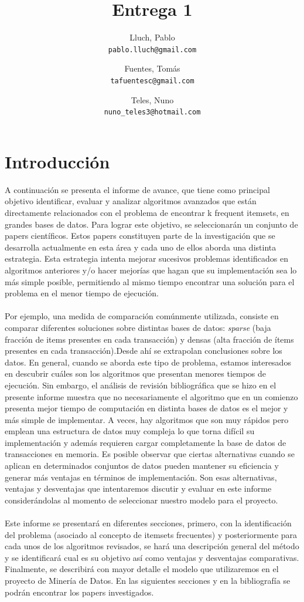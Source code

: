 \documentclass[12pt,spanish]{article}
\title{Entrega 1}
\author{
  Lluch, Pablo\\
  \texttt{pablo.lluch@gmail.com}
  \and
  Fuentes, Tomás\\
  \texttt{tafuentesc@gmail.com}
  \and
  Teles, Nuno\\
  \texttt{nuno\_teles3@hotmail.com}
}
\begin{document}
\maketitle
\newpage

\section{Introducci\'on}
A continuación se presenta el informe de avance, que tiene como principal objetivo identificar, evaluar y analizar algoritmos avanzados que están directamente relacionados con el problema de encontrar k frequent itemsets, en grandes bases de datos. Para lograr este objetivo, se seleccionar\'an un conjunto de papers científicos. Estos papers constituyen parte de la investigación que se desarrolla actualmente en esta área y cada uno de ellos aborda una distinta estrategia. Esta estrategia intenta mejorar sucesivos problemas identificados en algoritmos anteriores y/o hacer mejorías que hagan que su implementaci\'on sea lo más simple posible, permitiendo al mismo tiempo encontrar una solución para el problema en el menor tiempo de ejecución.
\\\\
Por ejemplo, una medida de comparación comúnmente utilizada, consiste en comparar diferentes soluciones sobre distintas bases de datos: \emph{sparse} (baja fracci\'on de items presentes en cada transacci\'on) y densas (alta fracción de ítems presentes en cada transacción).Desde ahí se extrapolan conclusiones sobre los datos. En general, cuando se aborda este tipo de problema, estamos interesados en descubrir cu\'ales son los algoritmos que presentan menores tiempos de ejecución. Sin embargo, el análisis de revisión bibliogr\'afica que se hizo en el presente informe muestra que no necesariamente el algoritmo que en un comienzo presenta mejor tiempo de computación en distinta bases de datos es el mejor y más simple de implementar. A veces, hay algoritmos que son muy rápidos pero emplean una estructura de datos muy compleja lo que torna difícil su implementación y además requieren cargar completamente la base de datos de transacciones en memoria. Es posible observar que ciertas alternativas cuando se aplican en determinados conjuntos de datos pueden mantener su eficiencia y generar  más ventajas en t\'erminos de implementación. Son esas alternativas, ventajas y desventajas que intentaremos discutir  y evaluar en este informe consider\'andolas al momento de seleccionar nuestro modelo para el proyecto.
\\\\
Este informe se presentará en diferentes secciones, primero, con la identificación del problema (asociado al concepto de itemsets frecuentes) y posteriormente para cada unos de los algoritmos revisados, se har\'a una descripción general del método y se identificar\'a cual es su objetivo así como ventajas y desventajas comparativas. Finalmente,  se describirá con mayor detalle el modelo que utilizaremos en el proyecto de Minería de Datos.
En las siguientes secciones y en la bibliograf\'ia se podr\'an encontrar los papers investigados.
\end{document}

